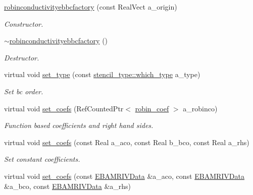 \begin{DoxyCompactItemize}
\item 
\hyperlink{classrobinconductivityebbcfactory_a3dcabdfb6e4d3319697ac15ea7658b80}{robinconductivityebbcfactory} (const Real\+Vect a\+\_\+origin)
\begin{DoxyCompactList}\small\item\em Constructor. \end{DoxyCompactList}\item 
\hyperlink{classrobinconductivityebbcfactory_a5454eeb59d780397a572dc8ba25d6eb2}{$\sim$robinconductivityebbcfactory} ()
\begin{DoxyCompactList}\small\item\em Destructor. \end{DoxyCompactList}\item 
virtual void \hyperlink{classrobinconductivityebbcfactory_a15451b6084edde96eca821012e91406b}{set\+\_\+type} (const \hyperlink{namespacestencil__type_a1ffed19935b7289b50e8dcc017ee99c8}{stencil\+\_\+type\+::which\+\_\+type} a\+\_\+type)
\begin{DoxyCompactList}\small\item\em Set bc order. \end{DoxyCompactList}\item 
virtual void \hyperlink{classrobinconductivityebbcfactory_aec376af2b9e36531ce68d2ad4e8b2356}{set\+\_\+coefs} (Ref\+Counted\+Ptr$<$ \hyperlink{classrobin__coef}{robin\+\_\+coef} $>$ a\+\_\+robinco)
\begin{DoxyCompactList}\small\item\em Function based coefficients and right hand sides. \end{DoxyCompactList}\item 
virtual void \hyperlink{classrobinconductivityebbcfactory_a5c6af50feb50b8945942fce91d4f8f26}{set\+\_\+coefs} (const Real a\+\_\+aco, const Real b\+\_\+bco, const Real a\+\_\+rhs)
\begin{DoxyCompactList}\small\item\em Set constant coefficients. \end{DoxyCompactList}\item 
virtual void \hyperlink{classrobinconductivityebbcfactory_aa699cabaa6c9496a6eb5e78fdbaebee6}{set\+\_\+coefs} (const \hyperlink{type__definitions_8H_a6b8fa905d55cbb491b52180386f0e0c1}{E\+B\+A\+M\+R\+I\+V\+Data} \&a\+\_\+aco, const \hyperlink{type__definitions_8H_a6b8fa905d55cbb491b52180386f0e0c1}{E\+B\+A\+M\+R\+I\+V\+Data} \&a\+\_\+bco, const \hyperlink{type__definitions_8H_a6b8fa905d55cbb491b52180386f0e0c1}{E\+B\+A\+M\+R\+I\+V\+Data} \&a\+\_\+rhs)

\end{DoxyCompactItemize}
